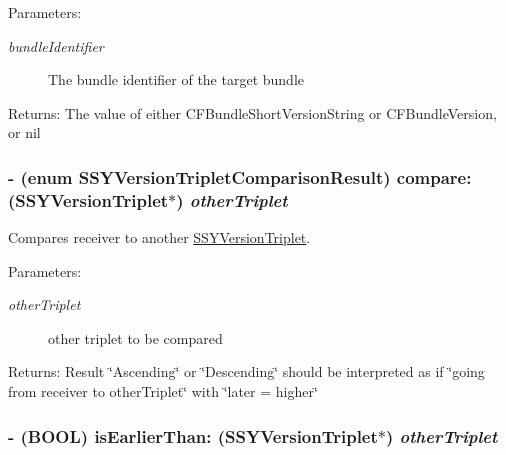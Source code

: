 \begin{Desc}
\item[Parameters:]
\begin{description}
\item[{\em bundleIdentifier}]The bundle identifier of the target bundle \end{description}
\end{Desc}
\begin{Desc}
\item[Returns:]The value of either CFBundleShortVersionString or CFBundleVersion, or nil \end{Desc}
\hypertarget{interface_s_s_y_version_triplet_4a0fc70cb8c34d49165e2120c001bec8}{
\subsubsection[{compare:}]{\setlength{\rightskip}{0pt plus 5cm}- (enum SSYVersionTripletComparisonResult) compare: ({\bf SSYVersionTriplet}$\ast$) {\em otherTriplet}}}
\label{interface_s_s_y_version_triplet_4a0fc70cb8c34d49165e2120c001bec8}


Compares receiver to another \hyperlink{interface_s_s_y_version_triplet}{SSYVersionTriplet}. 

\begin{Desc}
\item[Parameters:]
\begin{description}
\item[{\em otherTriplet}]other triplet to be compared \end{description}
\end{Desc}
\begin{Desc}
\item[Returns:]Result \char`\"{}Ascending\char`\"{} or \char`\"{}Descending\char`\"{} should be interpreted as if \char`\"{}going from receiver to otherTriplet\char`\"{} with \char`\"{}later = higher\char`\"{} \end{Desc}
\hypertarget{interface_s_s_y_version_triplet_73d22b05184aa3165c700c4ce40046e8}{
\subsubsection[{isEarlierThan:}]{\setlength{\rightskip}{0pt plus 5cm}- (BOOL) isEarlierThan: ({\bf SSYVersionTriplet}$\ast$) {\em otherTriplet}}}
\label{interface_s_s_y_version_triplet_73d22b05184aa3165c700c4ce40046e8}


